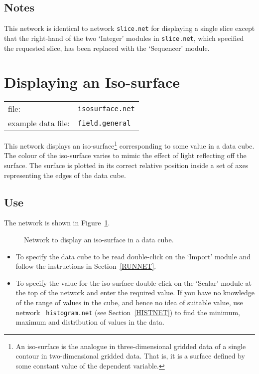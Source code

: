 \subsection{Notes}

This network is identical to network {\tt slice.net} for displaying
a single slice except that the right-hand of the two `Integer' modules
in {\tt slice.net}, which specified the requested slice, has been
replaced with the `Sequencer' module.


\newpage
\section{Displaying an Iso-surface}


\begin{tabular}{ll}
file:              & {\tt isosurface.net} \\
example data file: & {\tt field.general}  \\
\end{tabular}

This network displays an iso-surface\footnote{An iso-surface is the
analogue in three-dimensional gridded data of a single contour in
two-dimensional gridded data. That is, it is a surface defined by some
constant value of the dependent variable.} corresponding to some value in
a data cube. The colour of the iso-surface varies to mimic the effect
of light reflecting off the surface. The surface is plotted in its
correct relative position inside a set of axes representing the edges
of the data cube.

\subsection{Use}

The network is shown in Figure~\ref{ISOSURFNETF}.

\begin{figure}[htbp]

\begin{center}
\leavevmode
\epsfxsize=271pt
\end{center}

\caption[Network to display an iso-surface in a data cube.]{Network to
display an iso-surface in a data cube. \label{ISOSURFNETF} }

\end{figure}

\begin{itemize}

  \item To specify the data cube to be read double-click on the `Import'
   module and follow the instructions in Section~\ref{RUNNET}.

  \item To specify the value for the iso-surface double-click on the
   `Scalar' module at the top of the network and enter the required
   value.  If you have no knowledge of the range of values in the
   cube, and hence no idea of suitable value, use network {\tt
   histogram.net} (see Section~\ref{HISTNET}) to find the minimum,
   maximum and distribution of values in the data.

\end{itemize}

